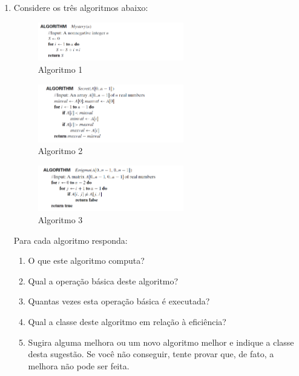 \documentclass{article}
\begin{document}
\begin{enumerate}
    \item Considere os três algoritmos abaixo: %
    
    \begin{figure}[!ht]
        \centering
        \includegraphics[width=0.6\textwidth]{alg1.PNG}
        \caption{Algoritmo 1}
        \label{fig:alg1}
    \end{figure}
    
    \begin{figure}[!ht]
        \centering
        \includegraphics[width=0.6\textwidth]{alg2.PNG}
        \caption{Algoritmo 2}
        \label{fig:alg2}
    \end{figure}
    
    \begin{figure}[!ht]
        \centering
        \includegraphics[width=0.6\textwidth]{alg3.PNG}
        \caption{Algoritmo 3}
        \label{fig:alg3}
    \end{figure}
    
    Para cada algoritmo responda:
    \begin{enumerate}
        \item O que este algoritmo computa?
        \item Qual a operação básica deste algoritmo?
        \item Quantas vezes esta operação básica é executada?
        \item Qual a classe deste algoritmo em relação à eficiência?
        \item Sugira alguma melhora ou um novo algoritmo melhor e indique a classe desta sugestão. Se você não conseguir, tente provar que, de fato, a melhora não pode ser feita. 
    \end{enumerate}
    

\end{enumerate}
\end{document}
